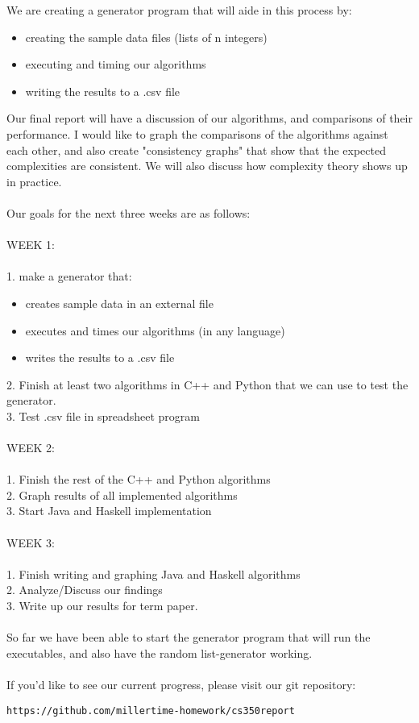 \documentclass[12pt]{amsart}
\begin{document}
We are creating a generator program that will aide in this process by:\\
\begin{itemize}
\item creating the sample data files (lists of n integers)
\item executing and timing our algorithms 
\item writing the results to a .csv file\\
\end{itemize}
Our final report will have a discussion of our algorithms, and comparisons of their performance. I would like to graph the comparisons of the algorithms against each other, and also create "consistency graphs" that show that the expected complexities are consistent. We will also discuss how complexity theory shows up in practice.\\ \\
Our goals for the next three weeks are as follows:\\ \\
WEEK 1:\\ \\
1. make a generator that:
\begin{itemize}
\item creates sample data in an external file
\item executes and times our algorithms (in any language)
\item writes the results to a .csv file
\end{itemize}
2. Finish at least two algorithms in C++ and Python that we can use to test the generator. \\
3. Test .csv file in spreadsheet program\\ \\
WEEK 2:\\ \\
1. Finish the rest of the C++ and Python algorithms\\ 
2. Graph results of all implemented algorithms\\
3. Start Java and Haskell implementation\\ \\
WEEK 3:\\ \\
1. Finish writing and graphing Java and Haskell algorithms\\
2. Analyze/Discuss our findings\\
3. Write up our results for term paper.\\
\\
So far we have been able to start the generator program that will run the executables, and also
have the random list-generator working.\\ \\
If you'd like to see our current progress, 
please visit our git repository: 
\begin{verbatim}
https://github.com/millertime-homework/cs350report
\end{verbatim}
\end{document}
